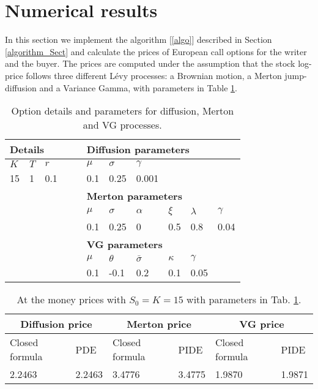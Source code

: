 \section{Numerical results}\label{numerical} 


In this section we implement the algorithm [\ref{algo}] described in Section \ref{algorithm_Sect} and calculate the prices of European call options for the writer and the buyer.
The prices are computed under the assumption that the stock log-price follows three different L\'evy processes: a Brownian motion, a Merton jump-diffusion and a Variance Gamma, with
parameters in Table \ref{tab:parameters}.
\begin{table}[ht]
\centering
 \begin{tabular}[t]{*{11}l}
 \toprule
  \multicolumn{5}{l}{\textbf{Details}} & \multicolumn{6}{l}{\textbf{Diffusion parameters}} \\
  \midrule
  $K$ & $T$ & $r$ & & & $\mu$ & $\sigma$ & $\gamma$ \\
  15 & 1 & 0.1 & & & 0.1 & 0.25 & 0.001 \\
  \toprule
  \multicolumn{5}{l}{} & \multicolumn{6}{l}{\textbf{Merton parameters}} \\
  \midrule
  & & & & & $\mu$ & $\sigma$ & $\alpha$ &$\xi$ & $\lambda$ & $\gamma$\\
  & & & & & 0.1 & 0.25 & 0 & 0.5 & 0.8 & 0.04\\
  \toprule
  \multicolumn{5}{l}{} & \multicolumn{6}{l}{\textbf{VG parameters}} \\
  \midrule
  & & & & & $\mu$ & $\theta$ & $\bar \sigma$ &$\kappa$ & $\gamma$ \\
  & & & & & 0.1 & -0.1 & 0.2 & 0.1 & 0.05 \\
\bottomrule
\end{tabular}
  \caption{Option details and parameters for diffusion, Merton and VG processes.}
  \label{tab:parameters}
\end{table}

\begin{table}[ht]
\centering
\begin{tabular}[t]{llllll}
\toprule
  \multicolumn{2}{c}{\textbf{Diffusion price}} &  \multicolumn{2}{c}{\textbf{Merton price}} &  \multicolumn{2}{c}{\textbf{VG price}} \\
\midrule
Closed formula & PDE & Closed formula & PIDE & Closed formula & PIDE\\
2.2463 & 2.2463 & 3.4776 & 3.4775 & 1.9870 & 1.9871\\
\bottomrule
\end{tabular}
\caption{At the money prices with $S_0=K=15$ with parameters in Tab. \ref{tab:parameters}.}
\label{tab:ATM_price}
\end{table}%

